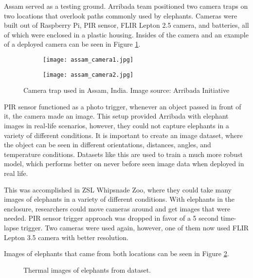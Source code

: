 Assam served as a testing ground.
Arribada team positioned two camera traps on two locations that overlook paths commonly used by elephants.
Cameras were built out of Raspberry Pi, PIR sensor, FLIR Lepton 2.5 camera, and batteries, all of which were enclosed in a plastic housing.
Insides of the camera and an example of a deployed camera can be seen in Figure \ref{assam_camera}.

\begin{figure}[ht]
    \begin{subfigure}{0.5\textwidth}
        \centering
        \texttt{[image: assam\_camera1.jpg]} 
    \end{subfigure}
    \begin{subfigure}{0.5\textwidth}
        \centering
        \texttt{[image: assam\_camera2.jpg]}
    \end{subfigure}
    \caption{Camera trap used in Assam, India. Image source: Arribada Initiative \cite{arribada-assam}}
    \label{assam_camera}
\end{figure}

PIR sensor functioned as a photo trigger, whenever an object passed in front of it, the camera made an image.
This setup provided Arribada with elephant images in real-life scenarios, however, they could not capture elephants in a variety of different conditions. 
It is important to create an image dataset, where the object can be seen in different orientations, distances, angles, and temperature conditions.
Datasets like this are used to train a much more robust model, which performs better on never before seen image data when deployed in real life.

This was accomplished in ZSL Whipsnade Zoo, where they could take many images of elephants in a variety of different conditions\cite{dataset_collection}.
With elephants in the enclosure, researchers could move cameras around and get images that were needed.
PIR sensor trigger approach was dropped in favor of a 5 second time-lapse trigger.
Two cameras were used again, however, one of them now used FLIR Lepton 3.5 camera with better resolution.

Images of elephants that came from both locations can be seen in Figure \ref{four_elephants}.

\begin{figure}[ht]
    \centering
    \caption{Thermal images of elephants from dataset.}
    \label{four_elephants}
\end{figure}

